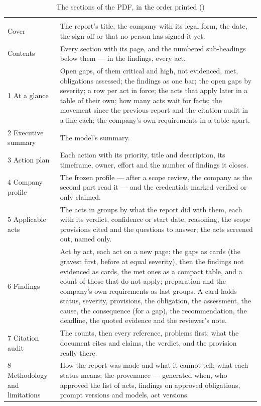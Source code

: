 \begin{xltabular}{\textwidth}{@{}L{36mm}Y@{}}
\caption{The sections of the PDF, in the order printed ()}\label{tab:report:pdf}\\
\toprule
{} &  \\
\midrule
\endfirsthead
\toprule
{} &  \\
\midrule
\endhead
\bottomrule
\endlastfoot
Cover & The report's title, the company with its legal form, the date, the sign-off or that no person has signed it yet. \\
Contents & Every section with its page, and the numbered sub-headings below them --- in the findings, every act. \\
1 At a glance & Open gaps, of them critical and high, not evidenced, met, obligations assessed; the findings as one bar; the open gaps by severity; a row per act in force; the acts that apply later in a table of their own; how many acts wait for facts; the movement since the previous report and the citation audit in a line each; the company's own requirements in a table apart. \\
2 Executive summary & The model's summary. \\
3 Action plan & Each action with its priority, title and description, its timeframe, owner, effort and the number of findings it closes. \\
4 Company profile & The frozen profile --- after a scope review, the company as the second part read it --- and the credentials marked verified or only claimed. \\
5 Applicable acts & The acts in groups by what the report did with them, each with its verdict, confidence or start date, reasoning, the scope provisions cited and the questions to answer; the acts screened out, named only. \\
6 Findings & Act by act, each act on a new page: the gaps as cards (the gravest first,  before  at equal severity), then the findings not evidenced as cards, the met ones as a compact table, and a count of those that do not apply; preparation and the company's own requirements as last groups. A card holds status, severity, provisions, the obligation, the assessment, the cause, the consequence (for a gap), the recommendation, the deadline, the quoted evidence and the reviewer's note. \\
7 Citation audit & The counts, then every reference, problems first: what the document cites and claims, the verdict, and the provision really there. \\
8 Methodology and limitations & How the report was made and what it cannot tell; what each status means; the provenance --- generated when, who approved the list of acts, findings on approved obligations, prompt versions and models, act versions. \\
\end{xltabular}

